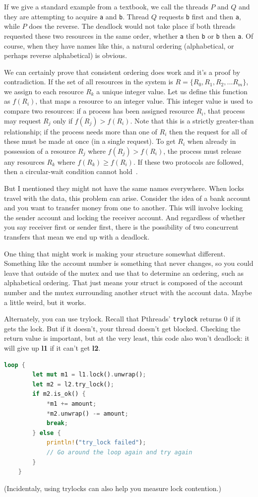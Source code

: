 \documentclass[a4paper]{report}
\begin{document}
If we give a standard example from a textbook, we call the threads $P$ and $Q$ and they are attempting to acquire \texttt{a} and \texttt{b}. Thread $Q$ requests \texttt{b} first and then \texttt{a}, while $P$ does the reverse. The deadlock would not take place if both threads requested these two resources in the same order, whether \texttt{a} then \texttt{b} or \texttt{b} then \texttt{a}. Of course, when they have names like this, a natural ordering (alphabetical, or perhaps reverse alphabetical) is obvious.

We can certainly prove that consistent ordering does work and it's a proof by contradiction. If the set of all resources in the system is $R = \{R_{0}, R_{1}, R_{2}, ... R_{m}\}$, we assign to each resource $R_{k}$ a unique integer value. Let us define this function as $f(R_{i})$, that maps a resource to an integer value. This integer value is used to compare two resources: if a process has been assigned resource $R_{i}$, that process may request $R_{j}$ only if $f(R_{j}) > f(R_{i})$. Note that this is a strictly greater-than relationship; if the process needs more than one of $R_{i}$ then the request for all of these must be made at once (in a single request). To get $R_{i}$ when already in possession of a resource $R_{j}$ where $f(R_{j}) > f(R_{i})$, the process must release any resources $R_{k}$ where $f(R_{k}) \geq f(R_{i})$. If these two protocols are followed, then a circular-wait condition cannot hold~\cite{osc}.

But I mentioned they might not have the same names everywhere. When locks travel with the data, this problem can arise. Consider the idea of a bank account and you want to transfer money from one to another. This will involve locking the sender account and locking the receiver account. And regardless of whether you say receiver first or sender first, there is the possibility of two concurrent transfers that mean we end up with a deadlock.

One thing that might work is making your structure somewhat different. Something like the account number is something that never changes, so you could leave that outside of the mutex and use that to determine an ordering, such as alphabetical ordering. That just means your struct is composed of the account number and the mutex surrounding another struct with the account data. Maybe a little weird, but it works.

Alternately, you can use trylock. Recall that Pthreads' {\tt trylock}
returns 0 if it gets the lock. But if it doesn't, your thread doesn't get blocked. Checking the return value is important, but at the very least, this code also won't deadlock: it will give up {\bf l1} if it can't get {\bf l2}.
  \begin{lstlisting}[language=Rust]
    loop {
        let mut m1 = l1.lock().unwrap();
        let m2 = l2.try_lock();
        if m2.is_ok() {
            *m1 += amount;
            *m2.unwrap() -= amount;
            break;
        } else {
            println!("try_lock failed");
            // Go around the loop again and try again
        }
    }
  \end{lstlisting}
  (Incidentaly, using trylocks can also help you measure lock contention.)
\end{document}
